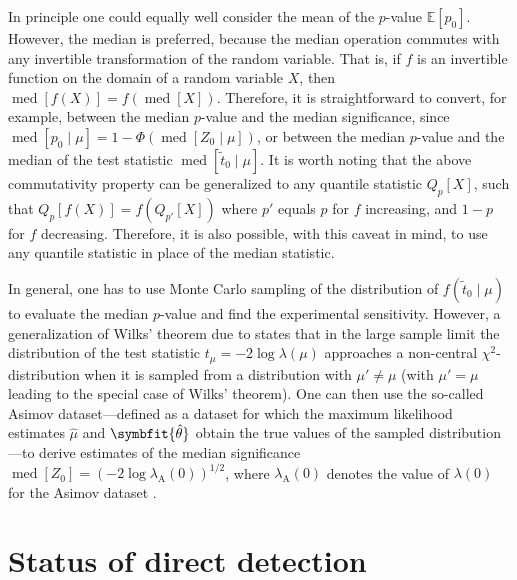 \documentclass[b5paper, 10pt, twoside]{book}
\newcommand{\unitv}[1]{\symbfit{\hat{#1}}}
\DeclareMathOperator{\med}{med}
\begin{document}
In principle one could equally well consider the mean of the $p$-value $\mathbb{E}[p_0]$. However, the median is preferred, because the median operation commutes with any invertible transformation of the random variable. That is, if $f$ is an invertible function on the domain of a random variable $X$, then $\med[f(X)]=f(\med[X])$. Therefore, it is straightforward to convert, for example, between the median $p$-value and the median significance, since $\med[p_0\mid\mu]=1-\Phi(\med[Z_0\mid\mu])$, or between the median $p$-value and the median of the test statistic $\med[\tilde{t}_0\mid\mu]$. It is worth noting that the above commutativity property can be generalized to any quantile statistic $Q_p[X]$, such that $Q_p[f(X)]=f(Q_{p'}[X])$ where $p'$ equals $p$ for $f$ increasing, and $1-p$ for $f$ decreasing. Therefore, it is also possible, with this caveat in mind, to use any quantile statistic in place of the median statistic.

In general, one has to use Monte Carlo sampling of the distribution of $f(\tilde{t}_0\mid\mu)$ to evaluate the median $p$-value and find the experimental sensitivity. However, a generalization of Wilks' theorem due to \textcite{Wald1943} states that in the large sample limit the distribution of the test statistic $t_\mu=-2\log\lambda(\mu)$ approaches a non-central $\chi^2$-distribution when it is sampled from a distribution with $\mu'\neq\mu$ (with $\mu'=\mu$ leading to the special case of Wilks' theorem). One can then use the so-called Asimov dataset---defined as a dataset for which the maximum likelihood estimates $\hat{\mu}$ and $\unitv{\theta}$ obtain the true values of the sampled distribution---to derive estimates of the median significance $\med[Z_0]=(-2\log\lambda_\text{A}(0))^{1/2}$, where $\lambda_\text{A}(0)$ denotes the value of $\lambda(0)$ for the Asimov dataset \parencite{CowanEtAl2011}.

\section{Status of direct detection}
\end{document}
